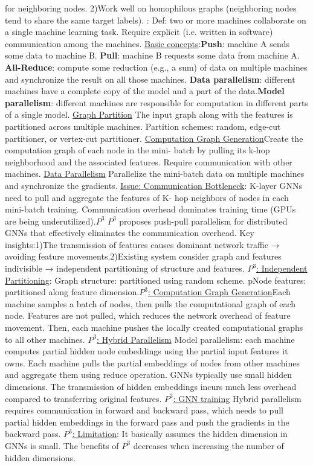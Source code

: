 for neighboring nodes. 2)Work well on homophilous graphs (neighboring nodes tend to share the same target labels). : Def: two or more machines collaborate on a single machine learning task. Require explicit (i.e. written in software) communication among the machines. \underline{Basic concepts}:\textbf{Push}: machine A sends some data to machine B. \textbf{Pull}: machine B requests some data from machine A. \textbf{All-Reduce}: compute some reduction (e.g., a sum) of data on multiple machines and synchronize the result on all those machines. \textbf{Data parallelism}: different machines have a complete copy of the model and a part of the data.\textbf{Model parallelism}: different machines are responsible for computation in different parts of a single model. \underline{Graph Partition} The input graph along with the features is partitioned across multiple machines. Partition schemes: random, edge-cut partitioner, or vertex-cut partitioner. \underline{Computation Graph Generation}Create the computation graph of each node in the mini- batch by pulling its k-hop neighborhood and the associated features. Require communication with other machines. \underline{Data Parallelism} Parallelize the mini-batch data on multiple machines and synchronize the gradients. \underline{Issue: Communication Bottleneck}: K-layer GNNs need to pull and aggregate the features of K- hop neighbors of nodes in each mini-batch training. Communication overhead dominates training time (GPUs are being underutilized).\underline{$P^3$} $P^3$ proposes push-pull parallelism for distributed GNNs that effectively eliminates the communication overhead. Key insights:1)The transmission of features causes dominant network traffic → avoiding feature movements.2)Existing system consider graph and features indivisible → independent partitioning of structure and features. \underline{$P^3$: Independent Partitioning}: Graph structure: partitioned using random scheme. pNode features: partitioned along feature dimension.\underline{$P^3$: Computation Graph Generation}Each machine samples a batch of nodes, then pulls the computational graph of each node. Features are not pulled, which reduces the network overhead of feature movement. Then, each machine pushes the locally created computational graphs to all other machines. \underline{$P^3$: Hybrid Parallelism} Model parallelism: each machine computes partial hidden node embeddings using the partial input features it owns. Each machine pulls the partial embeddings of nodes from other machines and aggregate them using reduce operation. GNNs typically use small hidden dimensions. The transmission of hidden embeddings incurs much less overhead compared to transferring original features. \underline{$P^3$: GNN training} Hybrid parallelism requires communication in forward and backward pass, which needs to pull partial hidden embeddings in the forward pass and push the gradients in the backward pass. \underline{$P^3$: Limitation}: It basically assumes the hidden dimension in GNNs is small. The benefits of $P^3$ decreases when increasing the number of hidden dimensions.


